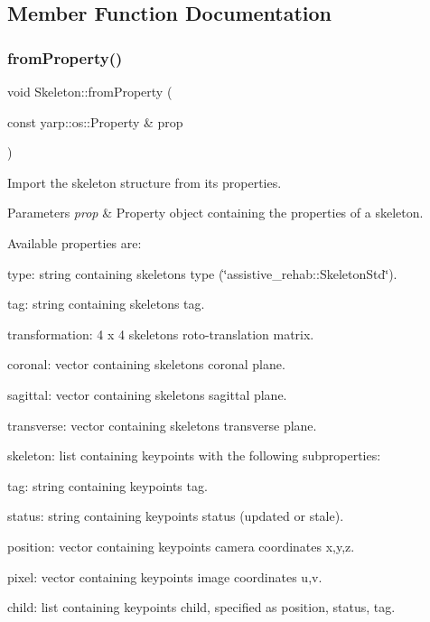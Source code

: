 \subsection{Member Function Documentation}
\mbox{\label{classassistive__rehab_1_1Skeleton_ac844f66503de87859833056dc33a835b}} 
\subsubsection{\texorpdfstring{fromProperty()}{fromProperty()}}
{\footnotesize\ttfamily void Skeleton\+::from\+Property (\begin{DoxyParamCaption}\item[{const yarp\+::os\+::\+Property \&}]{prop }\end{DoxyParamCaption})\hspace{0.3cm}{\ttfamily [virtual]}}



Import the skeleton structure from its properties. 


\begin{DoxyParams}{Parameters}
{\em prop} & Property object containing the properties of a skeleton.\\
\hline
\end{DoxyParams}
Available properties are\+:
\begin{DoxyItemize}
\item type\+: string containing skeleton\textquotesingle{}s type (\char`\"{}assistive\+\_\+rehab\+::\+Skeleton\+Std\char`\"{}).
\item tag\+: string containing skeleton\textquotesingle{}s tag.
\item transformation\+: 4 x 4 skeleton\textquotesingle{}s roto-\/translation matrix.
\item coronal\+: vector containing skeleton\textquotesingle{}s coronal plane.
\item sagittal\+: vector containing skeleton\textquotesingle{}s sagittal plane.
\item transverse\+: vector containing skeleton\textquotesingle{}s transverse plane.
\item skeleton\+: list containing keypoints with the following subproperties\+:
\begin{DoxyItemize}
\item tag\+: string containing keypoint\textquotesingle{}s tag.
\item status\+: string containing keypoint\textquotesingle{}s status (updated or stale).
\item position\+: vector containing keypoint\textquotesingle{}s camera coordinates x,y,z.
\item pixel\+: vector containing keypoint\textquotesingle{}s image coordinates u,v.
\item child\+: list containing keypoint\textquotesingle{}s child, specified as position, status, tag. 
\end{DoxyItemize}
\end{DoxyItemize}

